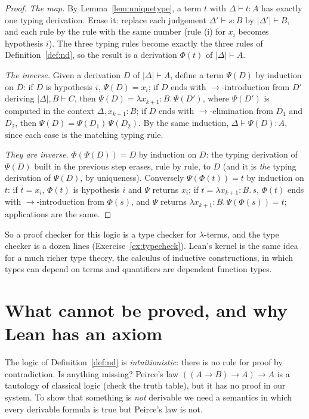 \begin{proof}
\emph{The map.} By Lemma~\ref{lem:uniquetype}, a term $t$ with $\Delta\vdash t:A$ has exactly one typing derivation. Erase it: replace each judgement $\Delta'\vdash s:B$ by $|\Delta'|\vdash B$, and each rule
by the rule with the same number (rule (i) for $x_i$ becomes hypothesis $i$). The three typing rules become exactly the three rules of Definition~\ref{def:nd}, so the result is a derivation $\Phi(t)$ of $|\Delta|\vdash A$.

\emph{The inverse.} Given a derivation $D$ of $|\Delta|\vdash A$, define a term $\Psi(D)$ by induction on $D$: if $D$ is hypothesis $i$, $\Psi(D)=x_i$; if $D$ ends with $\to$-introduction from $D'$ deriving
$|\Delta|,B\vdash C$, then $\Psi(D)=\lambda x_{k+1}{:}B.\,\Psi(D')$, where $\Psi(D')$ is computed in the context $\Delta,x_{k+1}{:}B$; if $D$ ends with $\to$-elimination from $D_1$ and $D_2$, then $\Psi(D)=\Psi(D_1)\,\Psi(D_2)$.
By the same induction, $\Delta\vdash\Psi(D):A$, since each case is the matching typing rule.

\emph{They are inverse.} $\Phi(\Psi(D))=D$ by induction on $D$: the typing derivation of $\Psi(D)$ built in the previous step erases, rule by rule, to $D$ (and it is \emph{the} typing derivation of $\Psi(D)$, by uniqueness). Conversely
$\Psi(\Phi(t))=t$ by induction on $t$: if $t=x_i$, $\Phi(t)$ is hypothesis $i$ and $\Psi$ returns $x_i$; if $t=\lambda x_{k+1}{:}B.\,s$, $\Phi(t)$ ends with $\to$-introduction from $\Phi(s)$, and $\Psi$ returns
$\lambda x_{k+1}{:}B.\,\Psi(\Phi(s))=t$; applications are the same.
\end{proof}

So a proof checker for this logic is a type checker for $\lambda$-terms, and the type checker is a dozen lines (Exercise~\ref{ex:typecheck}). Lean's kernel is the same idea for a much richer type
theory, the calculus of inductive constructions, in which types can depend on terms and quantifiers are dependent function types.

\section{What cannot be proved, and why Lean has an axiom}

The logic of Definition~\ref{def:nd} is \emph{intuitionistic}: there is no rule for proof by contradiction. Is anything missing? Peirce's law $((A\to B)\to A)\to A$ is a tautology of classical logic
(check the truth table), but it has no proof in our system. To show that something is \emph{not} derivable we need a semantics in which every derivable formula is true but Peirce's law is not.

